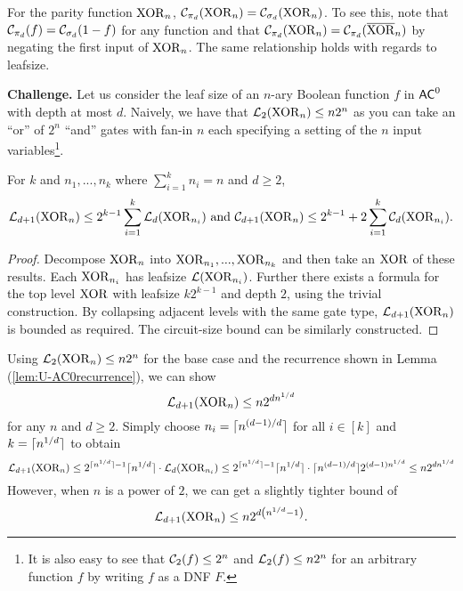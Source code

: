 \documentclass[11pt]{article}
\begin{document}
	For the parity function $\mathrm{XOR}_n$, $\mathcal{C}_{\pi_d}(\mathrm{XOR}_n) = \mathcal{C}_{\sigma_d}(\mathrm{XOR}_n)$. To see this, note that $\mathcal{C}_{\pi_d}(f) = \mathcal{C}_{\sigma_d}(1 - f)$ for any function and that $\mathcal{C}_{\pi_d}(\mathrm{XOR}_n) = \mathcal{C}_{\pi_d}(\overline{\mathrm{XOR}}_n)$ by negating the first input of $\mathrm{XOR}_n$. The same relationship holds with regards to leafsize.
	
	\textbf{Challenge.} Let us consider the leaf size of an $n$-ary Boolean function $f$ in $\mathsf{AC}^0$ with depth at most $d$. Naively, we have that $\mathcal{L}_2(\mathrm{XOR}_n) \leq n2^n$ as you can take an ``or'' of $2^n$ ``and'' gates with fan-in $n$ each specifying a setting of the $n$ input variables\footnote{It is also easy to see that $\mathcal{C}_2(f) \leq 2^n$ and $\mathcal{L}_2(f) \leq n2^n$ for an arbitrary function $f$ by writing $f$ as a DNF $F$.}.
	
	\begin{lemma}
		\label{lem:U-AC0recurrence}
		For $k$ and $n_1, ..., n_k$ where $\sum_{i = 1}^{k} n_i = n$ and $d \geq 2$, 
		\[\mathcal{L}_{d+1}(\mathrm{XOR}_n) \leq 2^{k-1}\sum_{i = 1}^{k}\mathcal{L}_{d}(\mathrm{XOR}_{n_i}) \mbox{ and } \mathcal{C}_{d+1}(\mathrm{XOR}_n) \leq 2^{k-1} + 2\sum_{i = 1}^{k}\mathcal{C}_d(\mathrm{XOR}_{n_i}).\]
	\end{lemma}
	\begin{proof}
		Decompose $\mathrm{XOR}_n$ into $\mathrm{XOR}_{n_1}, ..., \mathrm{XOR}_{n_k}$ and then take an $\mathrm{XOR}$ of these results. Each $\mathrm{XOR}_{n_i}$ has leafsize $\mathcal{L}(\mathrm{XOR}_{n_i})$. Further there exists a formula for the top level $\mathrm{XOR}$ with leafsize $k2^{k-1}$ and depth $2$, using the trivial construction. By collapsing adjacent levels with the same gate type, $\mathcal{L}_{d+1}(\mathrm{XOR}_n)$ is bounded as required. The circuit-size bound can be similarly constructed. 
	\end{proof}
	
	Using $\mathcal{L}_2(\mathrm{XOR}_n) \leq n2^n$ for the base case and the recurrence shown in Lemma (\ref{lem:U-AC0recurrence}), we can show 
	\[\mathcal{L}_{d+1}(\mathrm{XOR}_n) \leq n2^{dn^{1/d}}\]
	for any $n$ and $d \geq 2$. Simply choose $n_i = \lceil n^{(d-1)/d}\rceil$ for all $i \in [k]$ and $k = \lceil n^{1/d}\rceil$ to obtain 
	\[\mathcal{L}_{d+1}(\mathrm{XOR}_n) \leq 2^{\lceil n^{1/d}\rceil - 1}\lceil n^{1/d}\rceil\cdot\mathcal{L}_{d}(\mathrm{XOR}_{n_i}) \leq 2^{\lceil n^{1/d}\rceil - 1}\lceil n^{1/d}\rceil\cdot\lceil n^{(d-1)/d}\rceil2^{(d-1)n^{1/d}} \leq n2^{dn^{1/d}}\]	
	However, when $n$ is a power of $2$, we can get a slightly tighter bound of 
	\[\mathcal{L}_{d+1}(\mathrm{XOR}_n) \leq n2^{d\left(n^{1/d} - 1\right)}.\]
	
\end{document}
